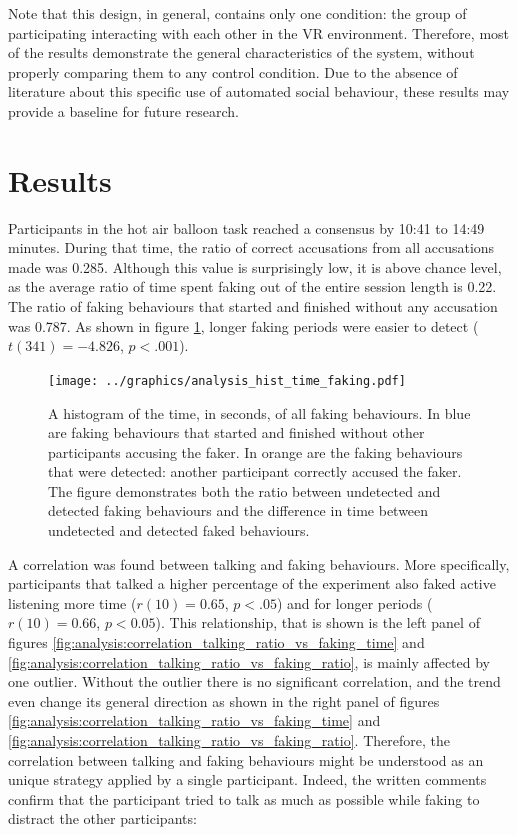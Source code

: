 \documentclass[]{simple-thesis}
\begin{document}
Note that this design, in general, contains only one condition: the group of participating interacting with each other in the VR environment.
Therefore, most of the results demonstrate the general characteristics of the system, without properly comparing them to any control condition.
Due to the absence of literature about this specific use of automated social behaviour, these results may provide a baseline for future research.

\section{Results}

Participants in the hot air balloon task reached a consensus by 10:41 to 14:49 minutes.
During that time, the ratio of correct accusations from all accusations made was 0.285.
Although this value is surprisingly low, it is above chance level, as the average ratio of time spent faking out of the entire session length is 0.22.
The ratio of faking behaviours that started and finished without any accusation was 0.787.
As shown in figure \ref{fig:analysis:hist_time_faking}, longer faking periods were easier to detect ($t(341) = -4.826$, $p < .001$).

\begin{figure}
  \centering
  \texttt{[image: ../graphics/analysis\_hist\_time\_faking.pdf]}
  \caption{A histogram of the time, in seconds, of all faking behaviours. In blue are faking behaviours that started and finished without other participants accusing the faker. In orange are the faking behaviours that were detected: another participant correctly accused the faker. The figure demonstrates both the ratio between undetected and detected faking behaviours and the difference in time between undetected and detected faked behaviours.}
  \label{fig:analysis:hist_time_faking}
\end{figure}

A correlation was found between talking and faking behaviours.
More specifically, participants that talked a higher percentage of the experiment also faked active listening more time ($r(10) = 0.65$, $p < .05$) and for longer periods ($r(10) = 0.66$, $p < 0.05$).
This relationship, that is shown is the left panel of figures \ref{fig:analysis:correlation_talking_ratio_vs_faking_time} and \ref{fig:analysis:correlation_talking_ratio_vs_faking_ratio}, is mainly affected by one outlier.
Without the outlier there is no significant correlation, and the trend even change its general direction as shown in the right panel of figures \ref{fig:analysis:correlation_talking_ratio_vs_faking_time} and \ref{fig:analysis:correlation_talking_ratio_vs_faking_ratio}.
Therefore, the correlation between talking and faking behaviours might be understood as an unique strategy applied by a single participant.
Indeed, the written comments confirm that the participant tried to talk as much as possible while faking to distract the other participants:
\end{document}
